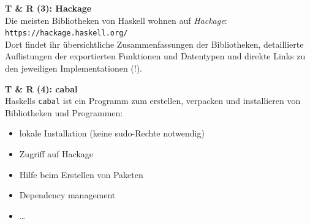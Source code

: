 \documentclass[unknownkeysallowed]{beamer}
\begin{document}
  
  \begin{frame}
    \begin{center}
    \Large\textbf{T \& R (3): Hackage}\\ \bigskip \normalsize
    Die meisten Bibliotheken von Haskell wohnen auf \emph{Hackage}: \\ \bigskip \texttt{https://hackage.haskell.org/} \\ \bigskip
    Dort findet ihr übersichtliche Zusammenfassungen der Bibliotheken, detaillierte Auflistungen der exportierten Funktionen und Datentypen und direkte Links zu den jeweiligen Implementationen (!).
    \end{center}
  \end{frame}
  
  
  \begin{frame}
    \begin{center}
    \Large\textbf{T \& R (4): cabal}\\ \bigskip \normalsize
    Haskells \texttt{cabal} ist ein Programm zum erstellen, verpacken und installieren
    von Bibliotheken und Programmen:
    
    \begin{itemize}
    \item lokale Installation (keine sudo-Rechte notwendig)
    \item Zugriff auf Hackage 
    \item Hilfe beim Erstellen von Paketen
    \item Dependency management
    \item \dots
    \end{itemize}
    \end{center}
  \end{frame}
  
  
\end{document}
